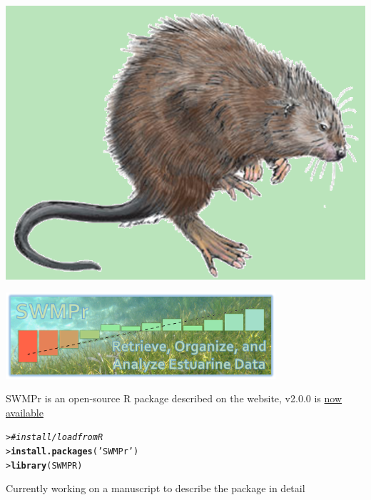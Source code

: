 \documentclass[serif]{beamer}\usepackage[]{graphicx}\usepackage[]{color}
\makeatletter
\newcommand{\hlstr}[1]{\textcolor[rgb]{0.192,0.494,0.8}{#1}}%
\newcommand{\hlcom}[1]{\textcolor[rgb]{0.678,0.584,0.686}{\textit{#1}}}%
\newcommand{\hlstd}[1]{\textcolor[rgb]{0.345,0.345,0.345}{#1}}%
\newcommand{\hlkwd}[1]{\textcolor[rgb]{0.737,0.353,0.396}{\textbf{#1}}}%
\newenvironment{kframe}{%
 \def\at@end@of@kframe{}%
 \ifinner\ifhmode%
  \def\at@end@of@kframe{\end{minipage}}%
  \begin{minipage}{\columnwidth}%
 \fi\fi%
 \def\FrameCommand##1{\hskip\@totalleftmargin \hskip-\fboxsep
 \colorbox{shadecolor}{##1}\hskip-\fboxsep
     \hskip-\linewidth \hskip-\@totalleftmargin \hskip\columnwidth}%
 \MakeFramed {\advance\hsize-\width
   \@totalleftmargin\z@ \linewidth\hsize
   \@setminipage}}%
 {\par\unskip\endMakeFramed%
 \at@end@of@kframe}
\newenvironment{knitrout}{}{} %
\makeatother
\begin{document}
\begin{frame}[fragile]{\includegraphics[width=0.05\paperwidth]{fig/muskrat.png}\hspace{0.07in}{\bf SWMPrats.net: The SWMPr package}}
\centerline{\includegraphics[width = 0.75\textwidth]{fig/swmpr_logo.png}}
\vspace{0.15in}
SWMPr is an open-source R package described on the website, v2.0.0 is \href{http://cran.r-project.org/web/packages/SWMPr/index.html}{now available}
\begin{knitrout}
\color{fgcolor}\begin{kframe}
\begin{alltt}
\hlstd{> }\hlcom{# install/load from R}
\hlstd{> }\hlkwd{install.packages}\hlstd{(}\hlstr{'SWMPr'}\hlstd{)}
\hlstd{> }\hlkwd{library}\hlstd{(SWMPR)}
\end{alltt}
\end{kframe}
\end{knitrout}
Currently working on a manuscript to describe the package in detail
\end{frame}
\end{document}
